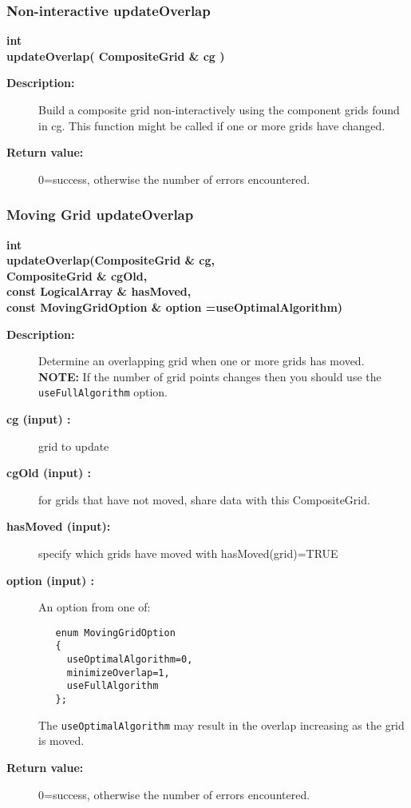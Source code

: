 \subsubsection{Non-interactive updateOverlap}
 
\begin{flushleft} \textbf{%
int  \\ 
\settowidth{\ogenUpdateIncludeArgIndent}{updateOverlap(}%
updateOverlap( CompositeGrid \& cg )
}\end{flushleft}
\begin{description}
\item[{\bf Description:}] 
 Build a composite grid non-interactively using the component grids found
 in cg. This function might be called if one or more grids have changed.
\item[{\bf Return value:}]  0=success, otherwise the number of errors encountered.
 
\end{description}
\subsubsection{Moving Grid updateOverlap}
 
\begin{flushleft} \textbf{%
int  \\ 
\settowidth{\ogenUpdateIncludeArgIndent}{updateOverlap(}%
updateOverlap(CompositeGrid \& cg, \\ 
\hspace{\ogenUpdateIncludeArgIndent}CompositeGrid \& cgOld, \\ 
\hspace{\ogenUpdateIncludeArgIndent}const LogicalArray \& hasMoved, \\ 
\hspace{\ogenUpdateIncludeArgIndent}const MovingGridOption \& option  =useOptimalAlgorithm)
}\end{flushleft}
\begin{description}
\item[{\bf Description:}] 
    Determine an overlapping grid when one or more grids has moved.
   {\bf NOTE:} If the number of grid points changes then you should use the 
   {\tt useFullAlgorithm} option.
 
\item[{\bf cg (input) :}]  grid to update
\item[{\bf cgOld (input) :}]  for grids that have not moved, share data with this CompositeGrid.
\item[{\bf hasMoved (input):}]  specify which grids have moved with hasMoved(grid)=TRUE
\item[{\bf option (input) :}]  An option from one of:
 {\footnotesize
 \begin{verbatim}
   enum MovingGridOption
   {
     useOptimalAlgorithm=0,
     minimizeOverlap=1,
     useFullAlgorithm
   };
 \end{verbatim}
 }
  The {\tt useOptimalAlgorithm} may result in the overlap increasing as the grid is moved.

\item[{\bf Return value:}]  0=success, otherwise the number of errors encountered.
 
\end{description}
